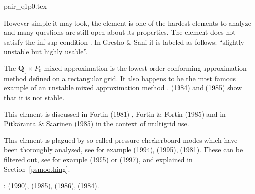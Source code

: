 \begin{flushright} {\tiny {\color{gray} pair\_q1p0.tex}} \end{flushright}


\begin{minipage}{0.48\textwidth}
\begin{center}

\end{center}
\end{minipage}
\begin{minipage}{0.48\textwidth}
\begin{center}

\end{center}
\end{minipage}

However simple it may look, the  element is 
one of the hardest elements to analyze and many questions are still open about its properties. 
The element does not satisfy the inf-sup condition \cite[p211]{hugh}. 
In Gresho \& Sani \cite{grsa} it is labeled as follows: ``slightly unstable but highly usable''. 

The ${\bm Q}_1 \times P_0$ mixed approximation is the lowest order conforming approximation 
method defined on a rectangular grid. It also happens to be the most famous example 
of an unstable mixed approximation method \cite[p235]{elsw}.
\textcite{boni84} (1984) and \textcite{boni85} (1985) show that it is not stable.

This element is discussed in Fortin (1981) \cite{fort81}, Fortin \& Fortin (1985) \cite{fofo85} 
and in Pitk\"aranta \& Saarinen (1985) \cite{pisa85} in the context of multigrid use.

This element is plagued by so-called pressure checkerboard modes which
have been thoroughly analysed, see for example \textcite{grsi94} (1994), 
\textcite{chpc95} (1995), \textcite{sagl81a,sagl81b} (1981).
These can be filtered out, see for example \textcite{chpc95} (1995) or \textcite{legs79} (1997), 
and explained in Section~\ref{psmoothing}.

\Literature: \textcite{fobo90} (1990), \cite{grle85} (1985),
\textcite{leru86} (1986), \textcite{odja84} (1984).

